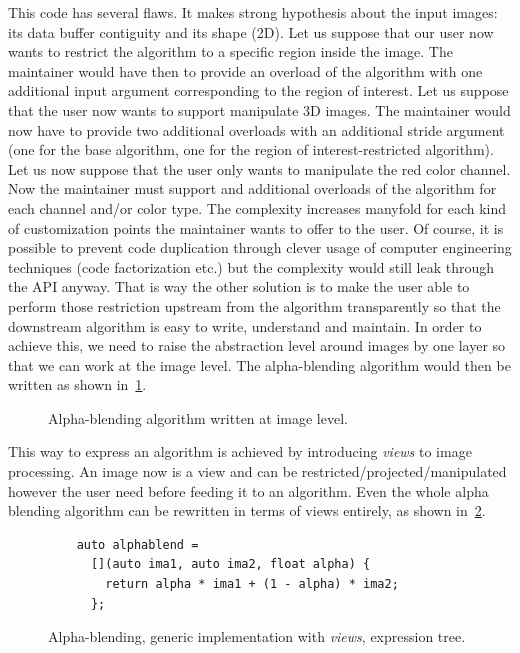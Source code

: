 This code has several flaws. It makes strong hypothesis about the input images: its data buffer contiguity and its shape
(2D). Let us suppose that our user now wants to restrict the algorithm to a specific region inside the image. The
maintainer would have then to provide an overload of the algorithm with one additional input argument corresponding to the
region of interest. Let us suppose that the user now wants to support manipulate 3D images. The maintainer would now
have to provide two additional overloads with an additional stride argument (one for the base algorithm, one for the
region of interest-restricted algorithm). Let us now suppose that the user only wants to manipulate the red color
channel. Now the maintainer must support and additional overloads of the algorithm for each channel and/or color type.
The complexity increases manyfold for each kind of customization points the maintainer wants to offer to the user. Of
course, it is possible to prevent code duplication through clever usage of computer engineering techniques (code
factorization etc.) but the complexity would still leak through the API anyway. That is way the other solution is to
make the user able to perform those restriction upstream from the algorithm transparently so that the downstream
algorithm is easy to write, understand and maintain. In order to achieve this, we need to raise the abstraction level
around images by one layer so that we can work at the image level. The alpha-blending algorithm would then be written as
shown in~\cref{fig:view.alphablend}.

\begin{figure}[htbp]
  \centering
  

  \caption{Alpha-blending algorithm written at image level.}
  \label{fig:view.alphablend}
\end{figure}

This way to express an algorithm is achieved by introducing \emph{views} to image processing. An image now is a view and
can be restricted/projected/manipulated however the user need before feeding it to an algorithm. Even the whole alpha
blending algorithm can be rewritten in terms of views entirely, as shown in~\cref{fig:new.alphablend}.

\begin{figure}[htbp]
  \centering
  \begin{minipage}[b]{5.5cm}
    
  \end{minipage}
  \begin{minipage}[b]{5.5cm}
    \begin{verbatim}
    auto alphablend =
      [](auto ima1, auto ima2, float alpha) {
        return alpha * ima1 + (1 - alpha) * ima2;
      };
    \end{verbatim}
    \bigskip
    \bigskip
    \bigskip
  \end{minipage}
  \caption{Alpha-blending, generic implementation with \emph{views}, expression tree.}
  \label{fig:new.alphablend}
\end{figure}

